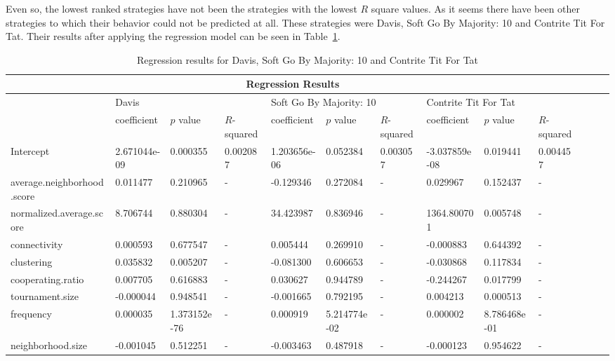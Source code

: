 Even so, the lowest ranked strategies have not been the strategies with the lowest
\(R\) square values. As it seems there have been other strategies to which their behavior
could not be predicted at all. These strategies were Davis, Soft Go By Majority: 10
and Contrite Tit For Tat. Their results after applying the regression model
can be seen in Table~\ref{reg-for-r-bot}.

\begin{table}[!hbtp]
	\centering
	\begin{adjustbox}{width=0.9\textwidth}
		\small
		\begin{tabular}{|l|l|l|l|l|l|l|l|l|l|l|l|l|}
			\toprule
			\multicolumn{10}{|c|}{\textbf{Regression Results}}                                                                       \\ \hline
			& \multicolumn{3}{l|}{Davis} & \multicolumn{3}{l|}{Soft Go By Majority: 10} & \multicolumn{3}{l|}{Contrite Tit For Tat}\\ \hline
			  & coefficient & \(p\) value & \(R\)-squared & coefficient & \(p\) value & \(R\)-squared & coefficient & \(p\) value & \(R\)-squared \\ \hline
			Intercept 								 &2.671044e-09  & 0.000355			& 0.002087	& 1.203656e-06	& 0.052384	& 0.003057	& -3.037859e-08 & 0.019441		 & 0.004457	\\ \hline
			average.neighborhood.score & 0.011477			& 0.210965			&	-					& -0.129346			& 0.272084 	& -					& 0.029967  		& 0.152437			& -         \\ \hline
			normalized.average.score	 & 8.706744			& 0.880304 			&	-					& 34.423987			& 0.836946 	& -					& 1364.800701 	& 0.005748			& -         \\ \hline
			connectivity							 & 0.000593			& 0.677547			&	-					& 0.005444			& 0.269910 	& -					& -0.000883			& 0.644392			& -         \\ \hline
			clustering  							 & 0.035832			& 0.005207			&	-					& -0.081300			& 0.606653	& -					& -0.030868 		& 0.117834			& -         \\ \hline
			cooperating.ratio					 & 0.007705			& 0.616883			&	-					& 0.030627 			& 0.944789 	& -					& -0.244267			& 0.017799			& -         \\ \hline
			tournament.size						 &-0.000044			& 0.948541			&	-					& -0.001665 		& 0.792195 	& -					& 0.004213 			& 0.000513			& -         \\ \hline
			frequency									 &0.000035			& 1.373152e-76	&	-					& 0.000919			& 5.214774e-02	& -			&  0.000002			& 8.786468e-01	& -         \\ \hline
			neighborhood.size			     &-0.001045			& 0.512251 			&	-					& -0.003463			& 0.487918			& -			& -0.000123 		& 0.954622	& -         		\\ \bottomrule
		\end{tabular}
	\end{adjustbox}
	\caption{Regression results for Davis, Soft Go By Majority: 10 and Contrite Tit For Tat}
	\label{reg-for-r-bot}
\end{table}


